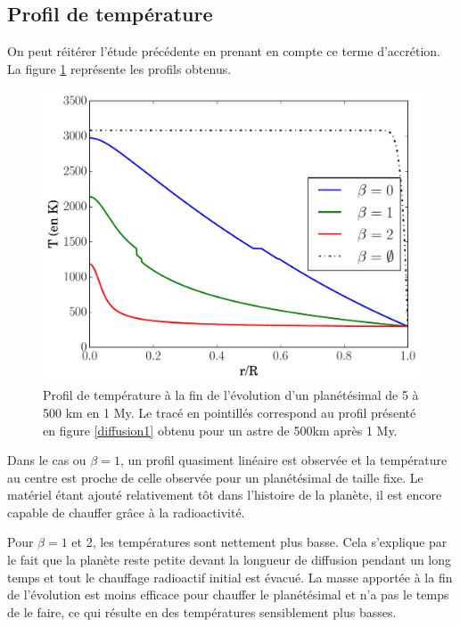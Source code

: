 \documentclass[10pt,a4paper]{article}
\numberwithin{equation}{section}
\begin{document}
\subsection{Profil de température}

On peut réitérer l'étude précédente en prenant en compte ce terme d'accrétion. La figure \ref{profilacre} représente les profils obtenus.

\begin{figure}[h]
    \centering	    
	\includegraphics[scale=0.43]{figures/profil_acre.pdf}
    \caption{Profil de température à la fin de l'évolution d'un planétésimal de 5 à 500 km en 1 My. Le tracé en pointillés correspond au profil présenté en figure \ref{diffusion1} obtenu pour un astre de 500km après 1 My.}
    	\label{profilacre} 
\end{figure}

Dans le cas ou $\beta = 1$, un profil quasiment linéaire est observée et la température au centre est proche de celle observée pour un planétésimal de taille fixe. Le matériel étant ajouté relativement tôt dans l'histoire de la planète, il est encore capable de chauffer grâce à la radioactivité. 
\medskip

Pour $\beta = 1$ et 2, les températures sont nettement plus basse. Cela s'explique par le fait que la planète reste petite devant la longueur de diffusion pendant un long temps et tout le chauffage radioactif initial est évacué. La masse apportée à la fin de l'évolution  est moins efficace pour chauffer le planétésimal et n'a pas le temps de le faire, ce qui résulte en des températures sensiblement plus basses.
\end{document}
